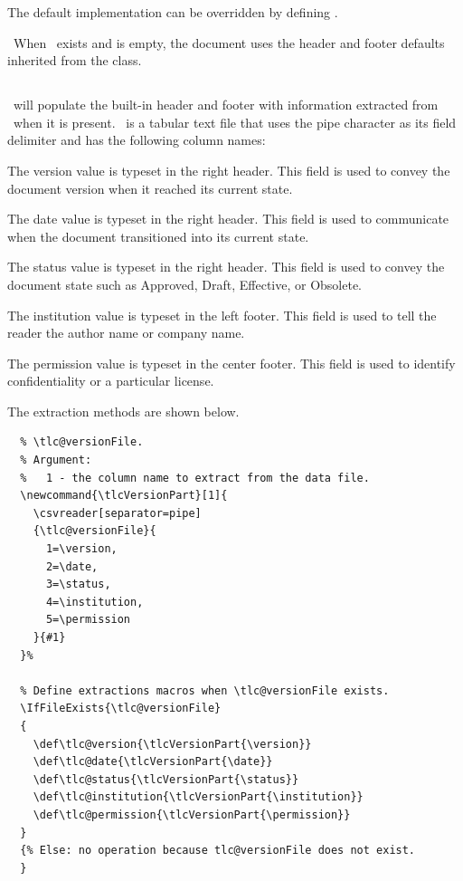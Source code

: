 \documentclass[12pt]{tlc-article}
\begin{document}
The default implementation can be overridden by defining \tlcHF.

\tlcNote\ When \tlcHF\ exists and is empty, the document uses the header and
footer defaults inherited from the  class.


\subsection{\tlcVE} \label{sec:version}
\tlcA\ will populate the built-in header and footer with information extracted
from \tlcVE\ when it is present. \tlcVE\ is a tabular text file that uses the
pipe character as its field delimiter and has the following column names:

\begin{description}[style=nextline]
  \item[version] The version value is typeset in the right header. This field is
    used to convey the document version when it reached its
    current state.

  \item[date] The date value is typeset in the right header. This field is used
    to communicate when the document transitioned into its current state.

  \item[status] The status value is typeset in the right header. This field is
    used to convey the document state such as Approved, Draft, Effective, or
    Obsolete.

  \item[institution] The institution value is typeset in the left footer. This
    field is used to tell the reader the author name or company name.

  \item[permission] The permission value is typeset in the center footer. This
    field is used to identify confidentiality or a particular license.

\end{description}

The extraction methods are shown below.
\begin{lstlisting}[basicstyle=\ttfamily\tiny]
  % Extract document status, document date and document version from
  % \tlc@versionFile.
  % Argument:
  %   1 - the column name to extract from the data file.
  \newcommand{\tlcVersionPart}[1]{
    \csvreader[separator=pipe]
    {\tlc@versionFile}{
      1=\version,
      2=\date,
      3=\status,
      4=\institution,
      5=\permission
    }{#1}
  }%

  % Define extractions macros when \tlc@versionFile exists.
  \IfFileExists{\tlc@versionFile}
  {
    \def\tlc@version{\tlcVersionPart{\version}}
    \def\tlc@date{\tlcVersionPart{\date}}
    \def\tlc@status{\tlcVersionPart{\status}}
    \def\tlc@institution{\tlcVersionPart{\institution}}
    \def\tlc@permission{\tlcVersionPart{\permission}}
  }
  {% Else: no operation because tlc@versionFile does not exist.
  }
\end{lstlisting}
\end{document}
